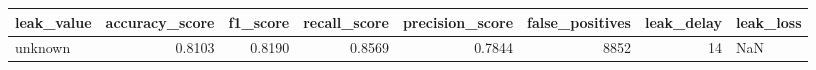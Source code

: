 \begin{tabular}{lrrrrrrl}
\toprule
leak\_value & accuracy\_score & f1\_score & recall\_score & precision\_score & false\_positives & leak\_delay & leak\_loss \\
\midrule
unknown & 0.8103 & 0.8190 & 0.8569 & 0.7844 & 8852 & 14 & NaN \\
\bottomrule
\end{tabular}
